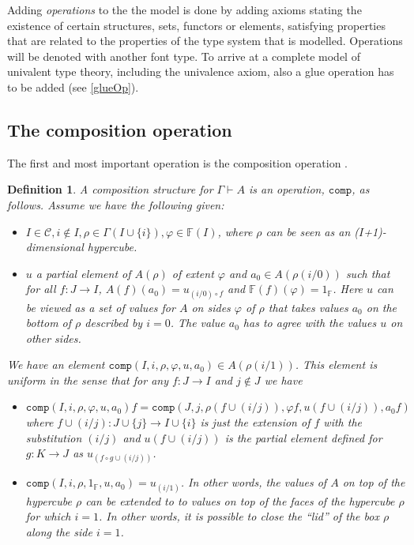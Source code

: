 \documentclass[12pt,a4paper,twoside,xetex,draft]{book}
\newcommand{\keyword}[1]{\emph{#1}\index{#1}}
\newtheorem{definition}[theorem]{Definition}
\newcommand{\op}[1]{\mathtt{#1}}
\begin{document}
Adding \keyword{operations} to the the model is done by adding axioms stating the existence of certain structures, sets, functors or elements, satisfying properties that are related to the properties of the type system that is modelled. Operations will be denoted with another font type. To arrive at a complete model of univalent type theory, including the univalence axiom, also a glue operation has to be added (see \cref{glueOp}). 

\subsection{The composition operation}

The first and most important operation is the composition operation \cite{Orton2019}. 

\begin{definition}\label{compdef}
A \keyword{composition structure} for $\Gamma \vdash A$ is an operation, $\op{comp}$, as follows. Assume we have the following given:

\begin{itemize}
\item $I \in \mathcal{C}, i \not \in I, \rho \in \Gamma(I \cup \{i\}), \varphi \in \mathbb{F}(I)$, where $\rho$ can be seen as an ($I$+1)-dimensional hypercube.
\item $u$ a partial element of $A(\rho)$ of extent $\varphi$ and $a_0 \in A(\rho (i/0))$ such that for all $f:J\rightarrow I$, $A(f)(a_0) = u _{(i/0) \circ f}$ and $\mathbb{F}(f)(\varphi) = 1_{\mathbb{F}}$. Here $u$ can be viewed as a set of values for $A$ on sides $\varphi$ of $\rho$ that takes values $a_0$ on the bottom of $\rho$ described by $i=0$. The value $a_0$ has to agree with the values $u$ on other sides.
\end{itemize}

We have an element $\op{comp}(I,i,\rho,\varphi, u,a_0)\in A(\rho(i/1))$. This element is uniform in the sense that for any $f:J \rightarrow I$ and $j \not \in J$ we have 

\begin{itemize}
\item $\op{comp} \left(I,i,\rho,\varphi, u , a_0 \right) f = \op{comp}(J,j,\rho(f \cup (i/j)), \varphi f, u(f \cup (i/j)), a_0 f)$  where $f \cup (i/j): J \cup \{j\} \rightarrow I \cup \{i\}$ is just the extension of $f$ with the substitution $(i/j)$ and $u(f \cup (i/j))$ is the partial element defined for $g: K \rightarrow J$ as $u_{(f \circ g \cup (i/j))}$.

\item $\op{comp}(I,i,\rho, 1_{\mathbb{F}}, u, a_0) = u_{(i/1)}$. In other words, the values of $A$ on top of the hypercube $\rho$ can be extended to to values on top of the faces of the hypercube $\rho$ for which $i=1$. In other words, it is possible to close the ``lid'' of the box $\rho$ along the side $i=1$.

\end{itemize}



\end{definition}
\end{document}
